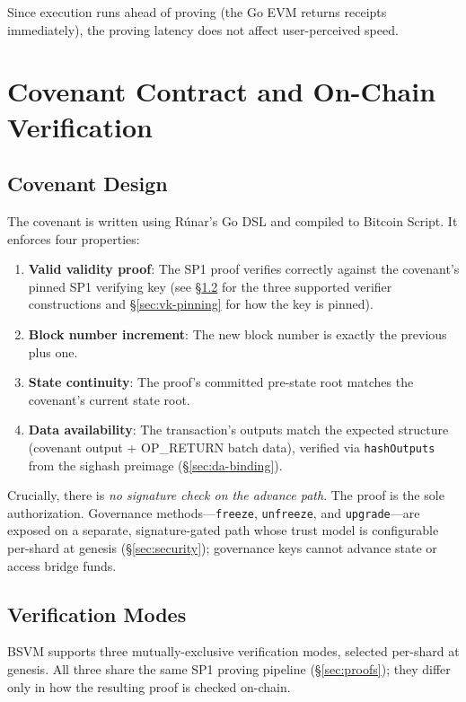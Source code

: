 \documentclass[11pt,twocolumn]{article}
\begin{document}
Since execution runs ahead of proving (the Go EVM returns receipts immediately), the proving latency does not affect user-perceived speed.

\section{Covenant Contract and On-Chain Verification}
\label{sec:covenant}

\subsection{Covenant Design}

The covenant is written using R\'{u}nar's Go DSL and compiled to Bitcoin Script. It enforces four properties:

\begin{enumerate}[nosep,leftmargin=1.5em]
\item \textbf{Valid validity proof}: The SP1 proof verifies correctly against the covenant's pinned SP1 verifying key (see \S\ref{sec:verification-modes} for the three supported verifier constructions and \S\ref{sec:vk-pinning} for how the key is pinned).
\item \textbf{Block number increment}: The new block number is exactly the previous plus one.
\item \textbf{State continuity}: The proof's committed pre-state root matches the covenant's current state root.
\item \textbf{Data availability}: The transaction's outputs match the expected structure (covenant output + OP\_RETURN batch data), verified via \texttt{hashOutputs} from the sighash preimage (\S\ref{sec:da-binding}).
\end{enumerate}

\noindent Crucially, there is \emph{no signature check on the advance path}. The proof is the sole authorization. Governance methods---\texttt{freeze}, \texttt{unfreeze}, and \texttt{upgrade}---are exposed on a separate, signature-gated path whose trust model is configurable per-shard at genesis (\S\ref{sec:security}); governance keys cannot advance state or access bridge funds.

\subsection{Verification Modes}
\label{sec:verification-modes}

BSVM supports three mutually-exclusive verification modes, selected per-shard at genesis. All three share the same SP1 proving pipeline (\S\ref{sec:proofs}); they differ only in how the resulting proof is checked on-chain.
\end{document}
